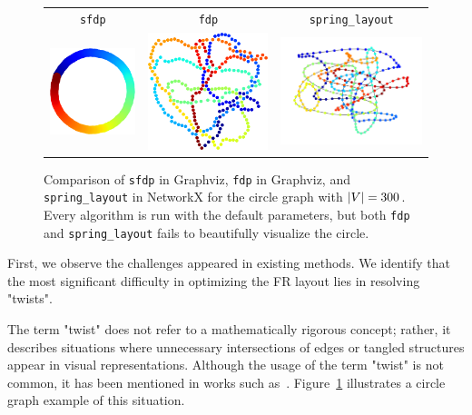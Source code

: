 \documentclass[dvipdfmx,lettersize,journal]{IEEEtran}
\begin{document}
\begin{figure}[t]
  \centering
  \begin{tabular}{ccc}
    \texttt{sfdp}                                             & \texttt{fdp} & \texttt{spring\_layout} \\
    \includegraphics[width=0.27\columnwidth]{circle/circle_sfdp.png} &
    \includegraphics[width=0.27\columnwidth]{circle/circle_fdp.png}  &
    \includegraphics[width=0.27\columnwidth]{circle/circle_fr.png}                                            \\
  \end{tabular}
  \caption{
    Comparison of \texttt{sfdp} in Graphviz, \texttt{fdp} in Graphviz, and \texttt{spring\_layout} in NetworkX for the circle graph with $\abs{V} = 300$.
    Every algorithm is run with the default parameters, but both \texttt{fdp} and \texttt{spring\_layout} fails to beautifully visualize the circle.
  }
  \label{fig:circle}
\end{figure}

First, we observe the challenges appeared in existing methods.
We identify that the most significant difficulty in optimizing the FR layout lies in resolving "twists".

The term "twist" does not refer to a mathematically rigorous concept; rather, it describes situations where unnecessary intersections of edges or tangled structures appear in visual representations.
Although the usage of the term "twist" is not common, it has been mentioned in works such as~\cite{cheongSnapshotVisualizationComplex2018}. Figure~\ref{fig:circle} illustrates a circle graph example of this situation.
\end{document}
